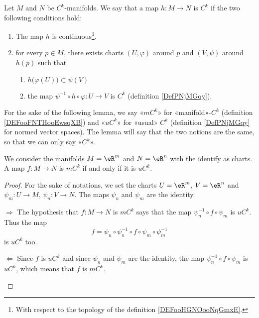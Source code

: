 \begin{definition}        \label{DEFooFNTHooEwsqXB}
    Let \( M\) and \( N\) be \( C^k\)-manifolds. We say that a map \( h\colon M\to N\) is \( C^k\) if the two following conditions hold:
    \begin{enumerate}
        \item
            The map \( h\) is continuous\footnote{With respect to the topology of the definition \ref{DEFooHGNOooNqGmxE}.}.
        \item
            for every \( p\in M\), there exists charts \( (U,\varphi)\) around \( p\) and \( (V,\psi)\) around \( h(p)\) such that
            \begin{enumerate}
                \item
                    \( h\big( \varphi(U) \big)\subset\psi(V)\)
                \item       \label{SUBITEMooXQFUooRxMVnw}
                    the map \( \psi^{-1}\circ h\circ\varphi\colon U \to V \) is \( C^k\) (definition \ref{DefPNjMGqy}).
            \end{enumerate}
    \end{enumerate}
\end{definition}

For the sake of the following lemma, we say «\( mC^k\)» for «manifold»-\( C^k\) (definition \ref{DEFooFNTHooEwsqXB}) and «\( uC^k\)» for «usual» \( C^k\) (definition \ref{DefPNjMGqy} for normed vector spaces). The lemma will say that the two notions are the same, so that we can only say «\( C^k\)».
\begin{lemma}
    We consider the manifolds \( M=\eR^m\) and \( N=\eR^n\) with the identify as charts. A map \( f\colon M\to N\) is \( mC^k\) if and only if it is \( uC^k\).
\end{lemma}

\begin{proof}
    For the sake of notations, we set the charts \( U=\eR^m\), \( V=\eR^n\) and \( \psi_m\colon U\to M\), \( \psi_n\colon V\to N\). The maps \( \psi_n\) and \( \psi_m\) are the identity.
    \begin{subproof}
    \item[\( \Rightarrow\)]
        The hypothesis that \( f\colon M\to N\) is \( mC^k\) says that the map \( \psi_n^{-1}\circ f\circ\psi_m\) is \( uC^k\). Thus the map
        \begin{equation}
            f=\psi_n\circ\psi_n^{-1}\circ f\circ\psi_m\circ\psi_m^{-1}
        \end{equation}
        is \( uC^k\) too.
    \item[\( \Leftarrow\)]
        Since \( f\) is \( uC^k\) and since \( \psi_n\) and \( \psi_m\) are the identity, the map \( \psi_n^{-1}\circ f\circ\psi_m\) is \( uC^k\), which means that \( f\) is \( mC^k\).
    \end{subproof}
\end{proof}

